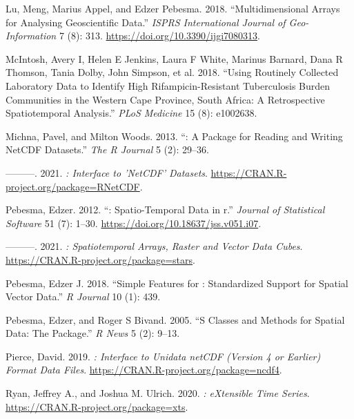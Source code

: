 \documentclass{article}
\newlength{\cslhangindent}
\newlength{\cslentryspacingunit} %
\newenvironment{CSLReferences}[2] %
 {%
  \setlength{\parindent}{0pt}
  \ifodd #1
  \let\oldpar\par
  \def\par{\hangindent=\cslhangindent\oldpar}
  \fi
  \setlength{\parskip}{#2\cslentryspacingunit}
 }%
 {}
\begin{document}
\begin{CSLReferences}{1}{0}
\leavevmode{}%
Lu, Meng, Marius Appel, and Edzer Pebesma. 2018. {``Multidimensional {Arrays} for {Analysing} {Geoscientific} {Data}.''} \emph{ISPRS International Journal of Geo-Information} 7 (8): 313. \url{https://doi.org/10.3390/ijgi7080313}.

\leavevmode{}%
McIntosh, Avery I, Helen E Jenkins, Laura F White, Marinus Barnard, Dana R Thomson, Tania Dolby, John Simpson, et al. 2018. {``Using Routinely Collected Laboratory Data to Identify High Rifampicin-Resistant Tuberculosis Burden Communities in the Western Cape Province, South Africa: A Retrospective Spatiotemporal Analysis.''} \emph{PLoS Medicine} 15 (8): e1002638.

\leavevmode{}%
Michna, Pavel, and Milton Woods. 2013. {``: A Package for Reading and Writing NetCDF Datasets.''} \emph{The R Journal} 5 (2): 29--36.

\leavevmode{}%
---------. 2021. \emph{: Interface to 'NetCDF' Datasets}. \url{https://CRAN.R-project.org/package=RNetCDF}.

\leavevmode{}%
Pebesma, Edzer. 2012. {``: Spatio-Temporal Data in r.''} \emph{Journal of Statistical Software} 51 (7): 1--30. \url{https://doi.org/10.18637/jss.v051.i07}.

\leavevmode{}%
---------. 2021. \emph{: Spatiotemporal Arrays, Raster and Vector Data Cubes}. \url{https://CRAN.R-project.org/package=stars}.

\leavevmode{}%
Pebesma, Edzer J. 2018. {``Simple Features for : Standardized Support for Spatial Vector Data.''} \emph{R Journal} 10 (1): 439.

\leavevmode{}%
Pebesma, Edzer, and Roger S Bivand. 2005. {``S Classes and Methods for Spatial Data: The  Package.''} \emph{R News} 5 (2): 9--13.

\leavevmode{}%
Pierce, David. 2019. \emph{: Interface to Unidata netCDF (Version 4 or Earlier) Format Data Files}. \url{https://CRAN.R-project.org/package=ncdf4}.

\leavevmode{}%
Ryan, Jeffrey A., and Joshua M. Ulrich. 2020. \emph{: eXtensible Time Series}. \url{https://CRAN.R-project.org/package=xts}.


\end{CSLReferences}
\end{document}
